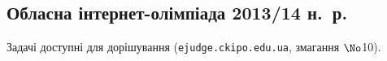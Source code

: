 
\subsection{Обласна інтернет-олімпіада 2013/14 н.~р.}
\renewenvironment{problemAllDefault}[1]{\vspace{10mm}\par\begin{problem}{#1}{Клавіатура (stdin)}{Екран (stdout)}{1 сек}{64 мегабайти}}{\end{problem}}

Задачі доступні для дорішування (\verb"ejudge.ckipo.edu.ua", змагання $\No$10).

\vspace{-0.5\baselineskip minus 1cm}
	

	

	

	


